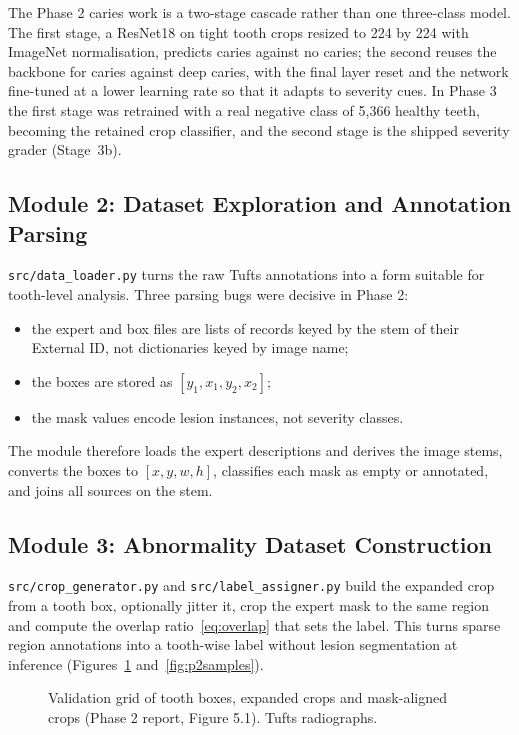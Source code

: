 The Phase 2 caries work is a two-stage cascade rather than one three-class model. The first stage, a
ResNet18 on tight tooth crops resized to 224 by 224 with ImageNet normalisation, predicts caries
against no caries; the second reuses the backbone for caries against deep caries, with the final layer
reset and the network fine-tuned at a lower learning rate so that it adapts to severity cues. In
Phase 3 the first stage was retrained with a real negative class of 5,366 healthy teeth, becoming the
retained crop classifier, and the second stage is the shipped severity grader (Stage~3b). %

\subsection{Module 2: Dataset Exploration and Annotation Parsing}

\texttt{src/data\_loader.py} turns the raw Tufts annotations into a form suitable for tooth-level
analysis. Three parsing bugs were decisive in Phase 2:
\begin{itemize}
\item the expert and box files are lists of records keyed by the stem of their External ID, not
  dictionaries keyed by image name;
\item the boxes are stored as $[y_1, x_1, y_2, x_2]$;
\item the mask values encode lesion instances, not severity classes.
\end{itemize}
The module therefore loads the expert descriptions and derives the image stems, converts the boxes to
$[x, y, w, h]$, classifies each mask as empty or annotated, and joins all sources on the stem.

\subsection{Module 3: Abnormality Dataset Construction}

\texttt{src/crop\_generator.py} and \texttt{src/label\_assigner.py} build the expanded crop from a tooth
box, optionally jitter it, crop the expert mask to the same region and compute the overlap
ratio~\eqref{eq:overlap} that sets the label. This turns sparse region annotations into a tooth-wise
label without lesion segmentation at inference (Figures~\ref{fig:p2grid} and~\ref{fig:p2samples}).

\begin{figure}[!htbp]
\centering
{}
\caption[Validation grid of tooth boxes, expanded crops and mask-aligned crops]{Validation grid of
tooth boxes, expanded crops and mask-aligned crops (Phase 2 report, Figure 5.1). Tufts radiographs.}
\label{fig:p2grid}
\end{figure}

